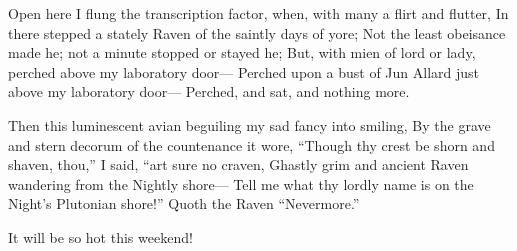 \documentclass{article}
\begin{document}
Open here I flung the transcription factor, when, with many a flirt and flutter,
In there stepped a stately Raven of the saintly days of yore;
Not the least obeisance made he; not a minute stopped or stayed he;
But, with mien of lord or lady, perched above my laboratory door—
Perched upon a bust of Jun Allard just above my laboratory door—
Perched, and sat, and nothing more.

Then this luminescent avian beguiling my sad fancy into smiling,
By the grave and stern decorum of the countenance it wore,
“Though thy crest be shorn and shaven, thou,” I said, “art sure no craven,
Ghastly grim and ancient Raven wandering from the Nightly shore—
Tell me what thy lordly name is on the Night’s Plutonian shore!”
Quoth the Raven “Nevermore.”

It will be so hot this weekend!
\end{document}
